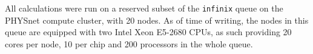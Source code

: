 \documentclass[main.tex]{subfiles}
\begin{document}
All calculations were run on a reserved subset of the \texttt{infinix} queue on the PHYSnet compute cluster, with 20 nodes.
As of time of writing, the nodes in this queue are equipped with two Intel Xeon E5-2680 CPUs, as such providing 20 cores per node, 10 per chip and 200 processors in the whole queue.


\end{document}
